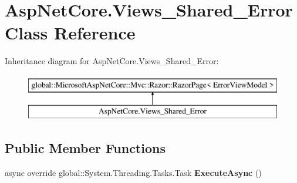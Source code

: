 \hypertarget{class_asp_net_core_1_1_views___shared___error}{}\section{Asp\+Net\+Core.\+Views\+\_\+\+Shared\+\_\+\+Error Class Reference}
\label{class_asp_net_core_1_1_views___shared___error}
Inheritance diagram for Asp\+Net\+Core.\+Views\+\_\+\+Shared\+\_\+\+Error\+:\begin{figure}[H]
\begin{center}
\leavevmode
\includegraphics[height=2.000000cm]{class_asp_net_core_1_1_views___shared___error}
\end{center}
\end{figure}
\subsection*{Public Member Functions}
\begin{DoxyCompactItemize}
\item 
\mbox{\label{class_asp_net_core_1_1_views___shared___error_a3cdb89b5008b1f7058bd2493983c0356}} 
async override global\+::\+System.\+Threading.\+Tasks.\+Task {\bfseries Execute\+Async} ()
\end{DoxyCompactItemize}
